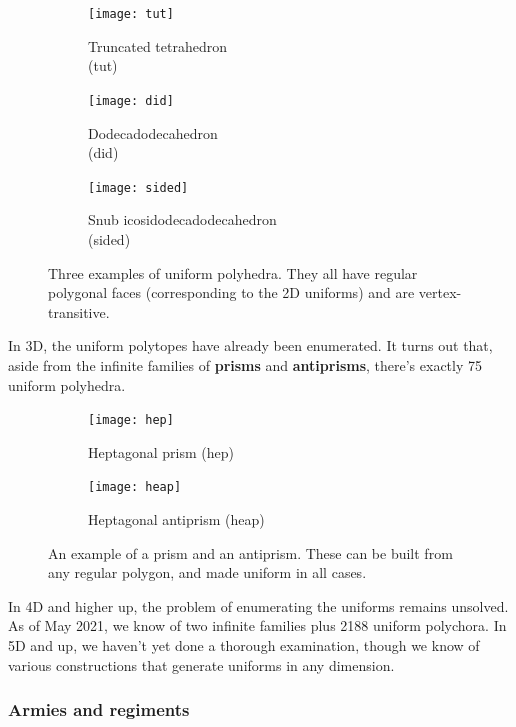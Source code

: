\documentclass{article}
\begin{document}
\begin{figure}[H]
\centering
\begin{subfigure}{.33333\textwidth}
  \centering
  \texttt{[image: tut]}
  \caption{Truncated tetrahedron\\(tut)}
  \label{fig:tut}
\end{subfigure}%
\begin{subfigure}{.33333\textwidth}
  \centering
  \texttt{[image: did]}
  \caption{Dodecadodecahedron\\(did)}
  \label{fig:did}
\end{subfigure}%
\begin{subfigure}{.33333\textwidth}
  \centering
  \texttt{[image: sided]}
  \caption{Snub icosidodecadodecahedron\\(sided)}
  \label{fig:sided}
\end{subfigure}%
\caption{Three examples of uniform polyhedra. They all have regular polygonal faces
  (corresponding to the 2D uniforms) and are vertex-transitive.}
\label{fig:uniforms3D}
\end{figure}

In 3D, the uniform polytopes have already been enumerated. It turns out that, aside from the
infinite families of \textbf{prisms} and \textbf{antiprisms}, there's exactly
75 uniform polyhedra.

\begin{figure}[H]
\centering
\begin{subfigure}{.5\textwidth}
  \centering
  \texttt{[image: hep]}
  \caption{Heptagonal prism (hep)}
  \label{fig:hep}
\end{subfigure}%
\begin{subfigure}{.5\textwidth}
  \centering
  \texttt{[image: heap]}
  \caption{Heptagonal antiprism (heap)}
  \label{fig:heap}
\end{subfigure}%
\caption{An example of a prism and an antiprism. These can be built from any regular polygon,
  and made uniform in all cases.}
\label{fig:prisms}
\end{figure}

In 4D and higher up, the problem of enumerating the uniforms remains unsolved.
As of May 2021, we know of two infinite families plus 2188 uniform polychora.
In 5D and up, we haven't yet done a thorough examination, though we know of various
constructions that generate uniforms in any dimension.

\subsubsection{Armies and regiments}
\end{document}
